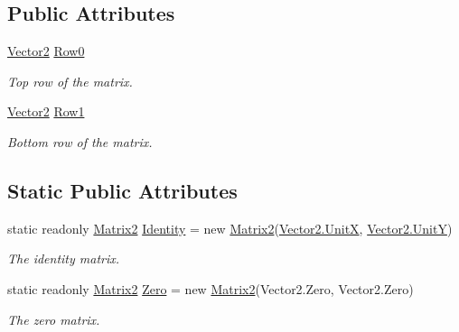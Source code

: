 \subsection*{Public Attributes}
\begin{DoxyCompactItemize}
\item 
\hyperlink{struct_open_t_k_1_1_vector2}{Vector2} \hyperlink{struct_open_t_k_1_1_matrix2_a7712c9d0c02c87fa1d98f4bb54cfc83f}{Row0}
\begin{DoxyCompactList}\small\item\em Top row of the matrix. \end{DoxyCompactList}\item 
\hyperlink{struct_open_t_k_1_1_vector2}{Vector2} \hyperlink{struct_open_t_k_1_1_matrix2_a27718ab92c9a8bad7f1d054b3f61841f}{Row1}
\begin{DoxyCompactList}\small\item\em Bottom row of the matrix. \end{DoxyCompactList}\end{DoxyCompactItemize}
\subsection*{Static Public Attributes}
\begin{DoxyCompactItemize}
\item 
static readonly \hyperlink{struct_open_t_k_1_1_matrix2}{Matrix2} \hyperlink{struct_open_t_k_1_1_matrix2_aa1ece0676cf9a9ca5e49671c03dd0ba0}{Identity} = new \hyperlink{struct_open_t_k_1_1_matrix2}{Matrix2}(\hyperlink{struct_open_t_k_1_1_vector2_a7f2eba13c36cf07b242119014b3cc959}{Vector2.\-Unit\-X}, \hyperlink{struct_open_t_k_1_1_vector2_ae71028930b0fc4172fddddad30a6cf23}{Vector2.\-Unit\-Y})
\begin{DoxyCompactList}\small\item\em The identity matrix. \end{DoxyCompactList}\item 
static readonly \hyperlink{struct_open_t_k_1_1_matrix2}{Matrix2} \hyperlink{struct_open_t_k_1_1_matrix2_aa14232ae27ca06ba9e721da3f8153dd5}{Zero} = new \hyperlink{struct_open_t_k_1_1_matrix2}{Matrix2}(Vector2.\-Zero, Vector2.\-Zero)
\begin{DoxyCompactList}\small\item\em The zero matrix. \end{DoxyCompactList}\end{DoxyCompactItemize}
